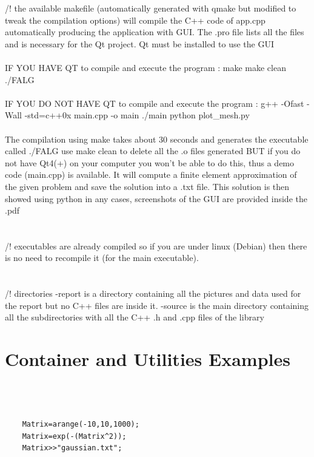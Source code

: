 \documentclass[a4paper]{report}
\begin{document}
/! the available makefile (automatically generated
with qmake but modified to tweak the compilation options)
will compile the C++ code of app.cpp automatically producing
the application with GUI. The .pro file lists all the files and
is necessary for the Qt project. Qt must be installed to use the GUI
\\
\\
IF YOU HAVE QT to compile and execute the program :
make
make clean
./FALG
\\
\\
IF YOU DO NOT HAVE QT  to compile and execute the program :
g++ -Ofast -Wall -std=c++0x main.cpp -o main
./main
python plot\_mesh.py
\\
\\
The compilation using make takes about 30 seconds and generates
the executable called ./FALG
use make clean to delete all the .o files generated
BUT if you do not have Qt4(+) on your computer you won't be able
to do this, thus a demo code (main.cpp) is available. It will compute
a finite element approximation of the given problem and save the solution
into a .txt file. This solution is then showed using python
in any cases, screenshots of the GUI are provided inside the .pdf
\\
\\
\\
/! executables are already compiled so if you are under linux (Debian)
then there is no need to recompile it (for the main executable).
\\
\\
\\
/! directories
-report is a directory containing all the pictures and data used
for the report but no C++ files are inside it.
-source is the main directory containing all the subdirectories
with all the C++ .h and .cpp files of the library


\section{Container and Utilities Examples}


\begin{lstlisting}[basicstyle=\tiny]



    Matrix=arange(-10,10,1000);
    Matrix=exp(-(Matrix^2));
    Matrix>>"gaussian.txt";


\end{lstlisting}
\end{document}
